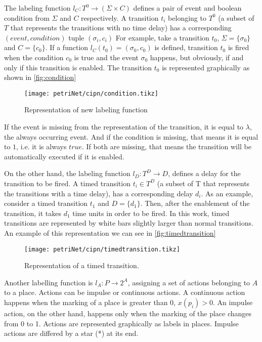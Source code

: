 The labeling function $l_C : T^0\rightarrow(\Sigma \times C)$ defines a pair of
event and boolean condition from $\Sigma$ and $C$ respectively. A transition
$t_i$ belonging to $T^0$ (a subset of $T$ that represents the transitions with
no time delay) has a corresponding $(event, condition)$ tuple $(\sigma_i,c_i)$
For example, take a transition $t_0$, $\Sigma =\{\sigma_0\}$ and $C=\{c_0\}$. If
a function $l_C(t_0)=(\sigma_0,c_0)$ is defined, transition $t_0$ is fired
when the condition $c_0$ is true and the event $\sigma_0$
happens, but obviously, if and only if this transition is enabled.
The transition $t_0$ is represented graphically as shown in \autoref{fig:condition}
\begin{figure}[H]
  \centering \texttt{[image: petriNet/cipn/condition.tikz]}
  \caption{Representation of new labeling function}
  \label{fig:condition}
\end{figure}
If the event is missing from the representation of the transition, it is equal
to $\lambda$, the always occurring event. And if the condition is missing, that means it is
equal to $1$, i.e. it is always $true$. If both are missing, that means the
transition will be automatically executed if it is enabled. 

On the other hand, the labeling function $l_D : T^D \rightarrow D$, defines a delay for the
transition to be fired. A timed transition $t_i \in T^D$ (a subset of T
that represents the transitions with a time delay), has a corresponding delay
$d_i$. As an example, consider a timed transition $t_1$ and $D=\{d_1\}$. Then, after the
enablement of the transition, it takes $d_1$ time units in order to be fired. In
this work, timed transitions are represented by white bars slightly larger than normal
transitions. An example of this representation we can see in \autoref{fig:timedtransition}
\begin{figure}[H]
  \centering \texttt{[image: petriNet/cipn/timedtransition.tikz]}
  \caption{Representation of a timed transition.}
  \label{fig:timedtransition}
\end{figure}
Another labelling function is $l_A : P\rightarrow 2^A$,
assigning a set of actions belonging to $A$ to a place. Actions can be impulse
or continuous actions. A
continuous action happens when the marking of a place is greater than 0,
$x(p_i)>0$. An impulse action, on the other hand, happens only when the marking of
the place changes from 0 to 1. 
Actions are represented graphically as labels in places. Impulse actions are
differed by a star (*) at its end.

